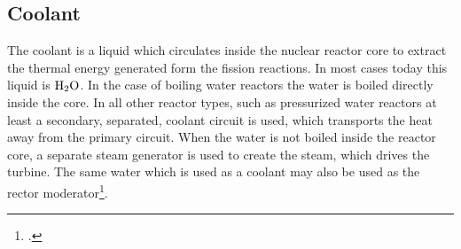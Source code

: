 \subsection{Coolant}
The coolant is a liquid which circulates inside the nuclear reactor core to extract the thermal energy
generated form the fission reactions. In most cases today this liquid is $\ce{H_{2}O}$. In the case
of boiling water reactors the water is boiled directly inside the core. In all other reactor types,
such as pressurized water reactors at least a secondary, separated, coolant circuit is used, which
transports the heat away from the primary circuit. When the water is not boiled inside the reactor
core, a separate steam generator is used to create the steam, which drives the turbine. The same
water which is used as a coolant may also be used as the rector moderator\footcite{WNPR}.